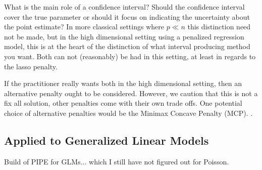 What is the main role of a confidence interval? Should the confidence interval cover the true parameter or should it focus on indicating the uncertainty about the point estimate? In more classical settings where $p \ll n$ this distinction need not be made, but in the high dimensional setting using a penalized regression model, this is at the heart of the distinction of what interval producing method you want. Both can not (reasonably) be had in this setting, at least in regards to the lasso penalty.

If the practitioner really wants both in the high dimensional setting, then an alternative penalty ought to be considered. However, we caution that this is not a fix all solution, other penalties come with their own trade offs. One potential choice of alternative penalties would be the Minimax Concave Penalty (MCP). .

\subsection{Applied to Generalized Linear Models}

Build of PIPE for GLMs... which I still have not figured out for Poisson.

